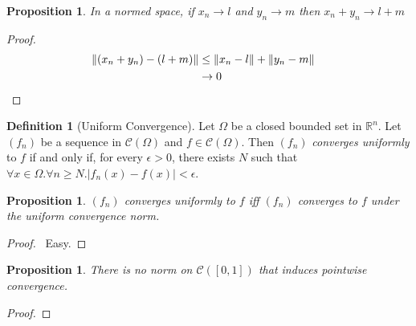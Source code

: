 \documentclass{book}
\let\qed\relax
\newtheorem{prop}[ax]{Proposition}
\theoremstyle{definition}
\newtheorem{df}[ax]{Definition}
\begin{document}
\begin{prop}
In a normed space, if $x_n \rightarrow l$ and $y_n \rightarrow m$ then $x_n + y_n \rightarrow l + m$
\end{prop}

\begin{proof}
\pf
\begin{align*}
\| (x_n + y_n) - (l + m) \| & \leq \| x_n - l \| + \| y_n - m \| \\
& \rightarrow 0 & \qed
\end{align*}
\end{proof}

\begin{df}[Uniform Convergence]
Let $\Omega$ be a closed bounded set in $\mathbb{R}^n$. Let $(f_n)$ be a sequence in $\mathcal{C}(\Omega)$ and $f \in \mathcal{C}(\Omega)$. Then $(f_n)$ \emph{converges uniformly} to $f$ if and only if, for every $\epsilon > 0$, there exists $N$ such that $\forall x \in \Omega. \forall n \geq N. |f_n(x) - f(x)| < \epsilon$.
\end{df}

\begin{prop}
$(f_n)$ converges uniformly to $f$ iff $(f_n)$ converges to $f$ under the uniform convergence norm.
\end{prop}

\begin{proof}
\pf\ Easy. \qed
\end{proof}

\begin{prop}
There is no norm on $\mathcal{C}([0,1])$ that induces pointwise convergence.
\end{prop}

\begin{proof}
\pf
{}
\qed
\end{proof}
\end{document}
